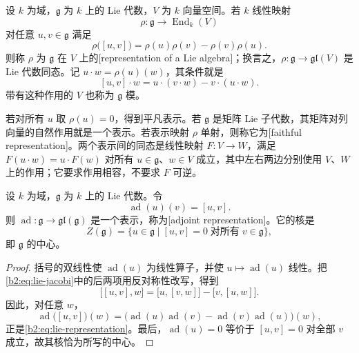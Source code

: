 \begin{definition}\label{b2:def:lie-representation}
	设 \(k\) 为域，\(\mathfrak g\) 为 \(k\) 上的 Lie 代数，\(V\) 为 \(k\) 向量空间。若 \(k\) 线性映射
	\[
		\rho:\mathfrak g\longrightarrow\operatorname{End}_k(V)
	\]
	对任意 \(u,v\in\mathfrak g\) 满足
	\begin{equation}\label{b2:eq:lie-representation}
		\rho\bigl([u,v]\bigr)=\rho(u)\rho(v)-\rho(v)\rho(u).
	\end{equation}
	则称 \(\rho\) 为 \(\mathfrak g\) 在 \(V\) 上的[representation of a Lie algebra]；换言之，\(\rho:\mathfrak g\to\mathfrak{gl}(V)\) 是 Lie 代数同态。记 \(u\cdot w=\rho(u)(w)\)，其条件就是
	\[
		[u,v]\cdot w=u\cdot(v\cdot w)-v\cdot(u\cdot w).
	\]
	带有这种作用的 \(V\) 也称为 \(\mathfrak g\) 模。
\end{definition}

若对所有 \(u\) 取 \(\rho(u)=0\)，得到平凡表示。若 \(\mathfrak g\) 是矩阵 Lie 子代数，其矩阵对列向量的自然作用就是一个表示。若表示映射 \(\rho\) 单射，则称它为[faithful representation]。两个表示间的同态是线性映射 \(F:V\to W\)，满足 \(F(u\cdot w)=u\cdot F(w)\) 对所有 \(u\in\mathfrak g\)、\(w\in V\) 成立，其中左右两边分别使用 \(V\)、\(W\) 上的作用；它要求作用相容，不要求 \(F\) 可逆。

\begin{proposition}\label{b2:prop:adjoint-lie-representation}
	设 \(k\) 为域，\(\mathfrak g\) 为 \(k\) 上的 Lie 代数。令
	\[
		\operatorname{ad}(u)(v)=[u,v].
	\]
	则 \(\operatorname{ad}:\mathfrak g\to\mathfrak{gl}(\mathfrak g)\) 是一个表示，称为[adjoint representation]。它的核是
	\[
		Z(\mathfrak g)=\bigl\{u\in\mathfrak g\mid [u,v]=0\;\text{对所有}\;v\in\mathfrak g\bigr\},
	\]
	即 \(\mathfrak g\) 的中心。
\end{proposition}
\begin{proof}
	括号的双线性使 \(\operatorname{ad}(u)\) 为线性算子，并使 \(u\mapsto\operatorname{ad}(u)\) 线性。把\eqref{b2:eq:lie-jacobi}中的后两项用反对称性改写，得到
	\[
		\bigl[[u,v],w\bigr] =\bigl[u,[v,w]\bigr]-\bigl[v,[u,w]\bigr].
	\]
	因此，对任意 \(w\)，
	\[
		\operatorname{ad}\bigl([u,v]\bigr)(w) =\bigl(\operatorname{ad}(u)\operatorname{ad}(v) -\operatorname{ad}(v)\operatorname{ad}(u)\bigr)(w),
	\]
	正是\eqref{b2:eq:lie-representation}。最后，\(\operatorname{ad}(u)=0\) 等价于 \([u,v]=0\) 对全部 \(v\) 成立，故其核恰为所写的中心。
\end{proof}

